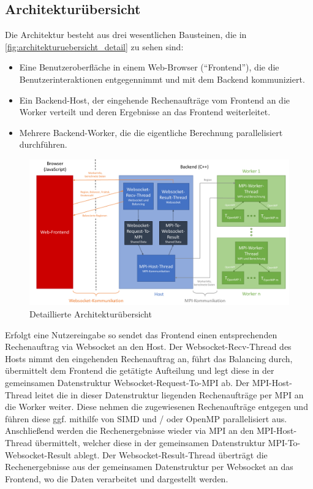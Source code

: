 \subsection{Architekturübersicht}
Die Architektur besteht aus drei wesentlichen Bausteinen, die in \autoref{fig:architekturuebersicht_detail} zu sehen sind:
\begin{itemize}
	\item Eine Benutzeroberfläche in einem Web-Browser (“Frontend”), die die Benutzerinteraktionen entgegennimmt und mit dem Backend kommuniziert.
	\item Ein Backend-Host, der eingehende Rechenaufträge vom Frontend an die Worker verteilt und deren Ergebnisse an das Frontend weiterleitet.
	\item Mehrere Backend-Worker, die die eigentliche Berechnung parallelisiert durchführen.
\end{itemize}
\begin{figure}[h!]
	\centering
	\includegraphics[width=0.98\linewidth]{img/Implementierung/ArchitekturAusfuehrlich.pdf}
	\caption{Detaillierte Architekturübersicht}
	\label{fig:architekturuebersicht_detail}
\end{figure}
Erfolgt eine Nutzereingabe so sendet das Frontend einen entsprechenden Rechenauftrag via Websocket an den Host.
Der Websocket-Recv-Thread des Hosts nimmt den eingehenden Rechenauftrag an, führt das Balancing durch, übermittelt dem Frontend die getätigte Aufteilung und legt diese in der gemeinsamen Datenstruktur Websocket-Request-To-MPI ab.
Der MPI-Host-Thread leitet die in dieser Datenstruktur liegenden Rechenaufträge per MPI an die Worker weiter.
Diese nehmen die zugewiesenen Rechenaufträge entgegen und führen diese ggf. mithilfe von SIMD und / oder OpenMP parallelisiert aus.
Anschließend werden die Rechenergebnisse wieder via MPI an den MPI-Host-Thread übermittelt, welcher diese in der gemeinsamen Datenstruktur MPI-To-Websocket-Result ablegt.
Der Websocket-Result-Thread überträgt die Rechenergebnisse aus der gemeinsamen Datenstruktur per Websocket an das Frontend, wo die Daten verarbeitet und dargestellt werden.



